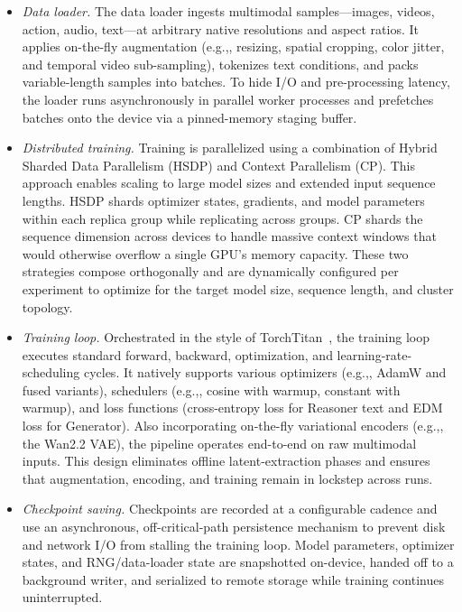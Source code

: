 \documentclass{llmxive}
\providecommand{\eg}{e.g.,\xspace}
\begin{document}
\begin{itemize}
    \item \textit{Data loader.} The data loader ingests multimodal samples---images, videos, action, audio, text---at arbitrary native resolutions and aspect ratios.  It applies on-the-fly augmentation (\eg, resizing, spatial cropping, color jitter, and temporal video sub-sampling), tokenizes text conditions, and packs variable-length samples into batches. To hide I/O and pre-processing latency, the loader runs asynchronously in parallel worker processes and prefetches batches onto the device via a pinned-memory staging buffer.

    \item \textit{Distributed training.} Training is parallelized using a combination of Hybrid Sharded Data Parallelism (HSDP) and Context Parallelism (CP). This approach enables scaling to large model sizes and extended input sequence lengths. HSDP shards optimizer states, gradients, and model parameters within each replica group while replicating across groups. CP shards the sequence dimension across devices to handle massive context windows that would otherwise overflow a single GPU's memory capacity. These two strategies compose orthogonally and are dynamically configured per experiment to optimize for the target model size, sequence length, and cluster topology.

    \item \textit{Training loop.} Orchestrated in the style of TorchTitan~\citep{torchtitan}, the training loop executes standard forward, backward, optimization, and learning-rate-scheduling cycles. It natively supports various optimizers (\eg, AdamW and fused variants), schedulers (\eg, cosine with warmup, constant with warmup), and loss functions (cross-entropy loss for Reasoner text and EDM loss for Generator). Also incorporating on-the-fly variational encoders (\eg, the Wan2.2 VAE), the pipeline operates end-to-end on raw multimodal inputs. This design eliminates offline latent-extraction phases and ensures that augmentation, encoding, and training remain in lockstep across runs.

    \item \textit{Checkpoint saving.} Checkpoints are recorded at a configurable cadence and use an asynchronous, off-critical-path persistence mechanism to prevent disk and network I/O from stalling the training loop. Model parameters, optimizer states, and RNG/data-loader state are snapshotted on-device, handed off to a background writer, and serialized to remote storage while training continues uninterrupted.
\end{itemize}
\end{document}
